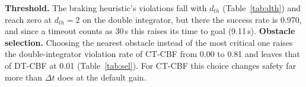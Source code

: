 \textbf{Threshold.} The braking heuristic's violations fall with $d_{th}$ (Table~\ref{tab:dth}) and reach zero at $d_{th}=2$ on the double integrator, but there the success rate is 0.970, and since a timeout counts as 30\,s this raises its time to goal (9.11\,s). \textbf{Obstacle selection.} Choosing the nearest obstacle instead of the most critical one raises the double-integrator violation rate of CT-CBF from 0.00 to 0.81 and leaves that of DT-CBF at 0.01 (Table~\ref{tab:sel}). For CT-CBF this choice changes safety far more than $\Delta t$ does at the default gain.

\begin{table}[t]\centering\caption{Braking threshold sweep, cells ``violation rate / worst penetration [m] / success rate / time to goal [s]'' (barrier level).}\label{tab:dth}
\footnotesize\setlength{\tabcolsep}{3pt}\end{table}
\begin{table}[t]\centering\caption{Obstacle selection (double integrator, $\alpha=2$, $\Delta t=0.05$), cells ``violation rate / worst penetration [m] / time to goal [s]''.}\label{tab:sel}
\footnotesize\end{table}
